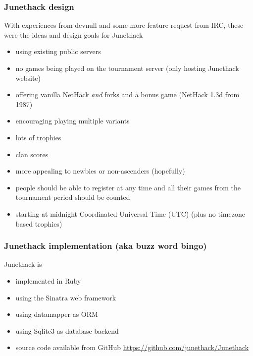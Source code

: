 \documentclass[handout]{beamer}
\begin{document}
\begin{frame}
\frametitle{Junethack design}
  With experiences from devnull and some more feature request from IRC, these were the ideas and design goals for Junethack\pause
  \begin{itemize}[<+->]
    \item using existing public servers
    \item no games being played on the tournament server (only hosting Junethack website)
    \item offering vanilla NetHack \textit{and} forks and a bonus game (NetHack 1.3d from 1987)
    \item encouraging playing multiple variants
    \item lots of trophies
    \item clan scores
    \item more appealing to newbies or non-ascenders (hopefully)
    \item people should be able to register at any time and all their games from the tournament period should be counted
    \item starting at midnight Coordinated Universal Time (UTC) (plus no timezone based trophies)
  \end{itemize}
\end{frame}

\begin{frame}
\frametitle{Junethack implementation (aka buzz word bingo)}
  Junethack is\pause
  \begin{itemize}[<+->]
    \item implemented in Ruby
    \item using the Sinatra web framework
    \item using datamapper as ORM
    \item using Sqlite3 as database backend
    \item source code available from GitHub \url{https://github.com/junethack/Junethack}
  \end{itemize}
\end{frame}
\end{document}
